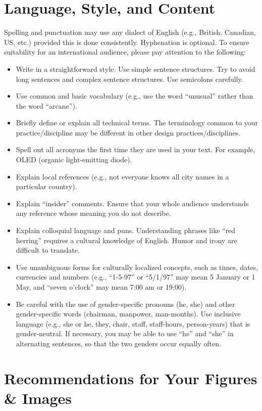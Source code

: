 \documentclass[9pt]{extarticle}
\begin{document}
\begin{multicols}{2}
\section{Language, Style, and Content}

Spelling and punctuation may use any dialect of English (e.g., British, Canadian, US, etc.) provided this is done consistently.
Hyphenation is optional.
To ensure suitability for an international audience, please pay attention to the following:

\begin{itemize}
    \item Write in a straightforward style. Use simple sentence structures. Try to avoid long sentences and complex sentence structures. Use semicolons carefully.
    \item Use common and basic vocabulary (e.g., use the word “unusual” rather than the word “arcane”).
    \item Briefly define or explain all technical terms. The terminology common to your practice/discipline may be different in other design practices/disciplines.
    \item Spell out all acronyms the first time they are used in your text. For example, OLED (organic light-emitting diode).
    \item Explain local references (e.g., not everyone knows all city names in a particular country).
    \item Explain “insider” comments. Ensure that your whole audience understands any reference whose meaning you do not describe.
    \item Explain colloquial language and puns. Understanding phrases like “red herring” requires a cultural knowledge of English. Humor and irony are difficult to translate.
    \item Use unambiguous forms for culturally localized concepts, such as times, dates, currencies and numbers (e.g., “1-5-97” or “5/1/97” may mean 5 January or 1 May, and “seven o'clock” may mean 7:00 am or 19:00).
    \item Be careful with the use of gender-specific pronouns (he, she) and other gender-specific words (chairman, manpower, man-months). Use inclusive language (e.g., she or he, they, chair, staff, staff-hours, person-years) that is gender-neutral. If necessary, you may be able to use “he” and “she” in alternating sentences, so that the two genders occur equally often. 
\end{itemize}

\section{Recommendations for Your Figures \& Images}


\end{multicols}
\end{document}
